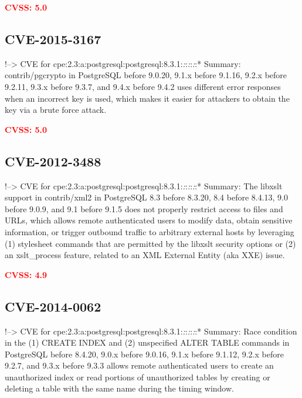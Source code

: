 \documentclass[a4paper, 12pt]{article}
\begin{document}
\textbf{\textcolor{red}{CVSS: 5.0}}

\hypertarget{cve-2015-3167}{%
\subsection{CVE-2015-3167}\label{cve-2015-3167}}

!--\textgreater{} CVE for
cpe:2.3:a:postgresql:postgresql:8.3.1:\emph{:}:\emph{:}:\emph{:}:*
Summary: contrib/pgcrypto in PostgreSQL before 9.0.20, 9.1.x before
9.1.16, 9.2.x before 9.2.11, 9.3.x before 9.3.7, and 9.4.x before 9.4.2
uses different error responses when an incorrect key is used, which
makes it easier for attackers to obtain the key via a brute force
attack.

\textbf{\textcolor{red}{CVSS: 5.0}}

\hypertarget{cve-2012-3488}{%
\subsection{CVE-2012-3488}\label{cve-2012-3488}}

!--\textgreater{} CVE for
cpe:2.3:a:postgresql:postgresql:8.3.1:\emph{:}:\emph{:}:\emph{:}:*
Summary: The libxslt support in contrib/xml2 in PostgreSQL 8.3 before
8.3.20, 8.4 before 8.4.13, 9.0 before 9.0.9, and 9.1 before 9.1.5 does
not properly restrict access to files and URLs, which allows remote
authenticated users to modify data, obtain sensitive information, or
trigger outbound traffic to arbitrary external hosts by leveraging (1)
stylesheet commands that are permitted by the libxslt security options
or (2) an xslt\_process feature, related to an XML External Entity (aka
XXE) issue.

\textbf{\textcolor{red}{CVSS: 4.9}}

\hypertarget{cve-2014-0062}{%
\subsection{CVE-2014-0062}\label{cve-2014-0062}}

!--\textgreater{} CVE for
cpe:2.3:a:postgresql:postgresql:8.3.1:\emph{:}:\emph{:}:\emph{:}:*
Summary: Race condition in the (1) CREATE INDEX and (2) unspecified
ALTER TABLE commands in PostgreSQL before 8.4.20, 9.0.x before 9.0.16,
9.1.x before 9.1.12, 9.2.x before 9.2.7, and 9.3.x before 9.3.3 allows
remote authenticated users to create an unauthorized index or read
portions of unauthorized tables by creating or deleting a table with the
same name during the timing window.
\end{document}

